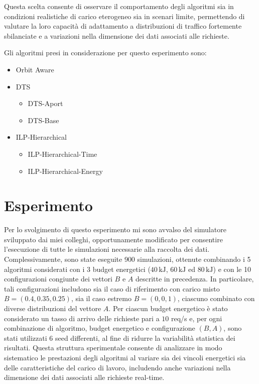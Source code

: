 \documentclass[12pt]{article}
\begin{document}
Questa scelta consente di osservare il comportamento degli algoritmi sia in condizioni realistiche di carico eterogeneo sia in scenari limite, permettendo di valutare la loro capacità di adattamento a distribuzioni di traffico fortemente sbilanciate e a variazioni nella dimensione dei dati associati alle richieste.

Gli algoritmi presi in considerazione per questo esperimento sono:
\begin{itemize}
    \item Orbit Aware
    \item DTS
        \begin{itemize}
            \item DTS-Aport
            \item DTS-Base
        \end{itemize}
    \item ILP-Hierarchical
        \begin{itemize}
            \item ILP-Hierarchical-Time
            \item ILP-Hierarchical-Energy
        \end{itemize}
        
\end{itemize}

\section{Esperimento}
Per lo svolgimento di questo esperimento mi sono avvalso del simulatore sviluppato dai miei colleghi, opportunamente modificato per consentire l’esecuzione di tutte le simulazioni necessarie alla raccolta dei dati. Complessivamente, sono state eseguite 900 simulazioni, ottenute combinando i 5 algoritmi considerati con i 3 budget energetici ($40\,\mathrm{kJ}$, $60\,\mathrm{kJ}$ ed $80\,\mathrm{kJ}$) e con le 10 configurazioni congiunte dei vettori $B$ e $A$ descritte in precedenza. In particolare, tali configurazioni includono sia il caso di riferimento con carico misto $B=(0.4, 0.35, 0.25)$, sia il caso estremo $B=(0,0,1)$, ciascuno combinato con diverse distribuzioni del vettore $A$. Per ciascun budget energetico è stato considerato un tasso di arrivo delle richieste pari a $10$ req/s e, per ogni combinazione di algoritmo, budget energetico e configurazione $(B,A)$, sono stati utilizzati 6 seed differenti, al fine di ridurre la variabilità statistica dei risultati. Questa struttura sperimentale consente di analizzare in modo sistematico le prestazioni degli algoritmi al variare sia dei vincoli energetici sia delle caratteristiche del carico di lavoro, includendo anche variazioni nella dimensione dei dati associati alle richieste real-time.
\end{document}
